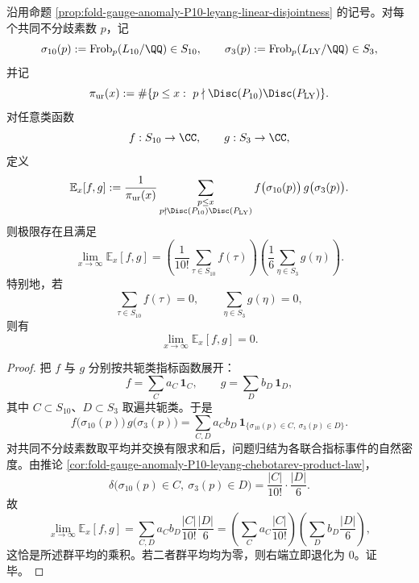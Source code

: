 \begin{theorem}\label{thm:xi-time-part9zl-leyang-rh-central-observable-decorrelation}
沿用命题 \ref{prop:fold-gauge-anomaly-P10-leyang-linear-disjointness} 的记号。对每个共同不分歧素数 \(p\)，记
\[
\sigma_{10}(p):=\mathrm{Frob}_p(L_{10}/\QQ)\in S_{10},
\qquad
\sigma_3(p):=\mathrm{Frob}_p(L_{\mathrm{LY}}/\QQ)\in S_3,
\]
并记
\[
\pi_{\mathrm{ur}}(x)
:=
\#\{p\le x:\ p\nmid \Disc(P_{10})\Disc(P_{\mathrm{LY}})\}.
\]
对任意类函数
\[
f:S_{10}\to\CC,
\qquad
g:S_3\to\CC,
\]
定义
\[
\mathbb E_x[f,g]
:=
\frac{1}{\pi_{\mathrm{ur}}(x)}
\sum_{\substack{p\le x\\ p\nmid \Disc(P_{10})\Disc(P_{\mathrm{LY}})}}
f\bigl(\sigma_{10}(p)\bigr)\,
g\bigl(\sigma_3(p)\bigr).
\]
则极限存在且满足
\[
\lim_{x\to\infty}\mathbb E_x[f,g]
=
\left(\frac{1}{10!}\sum_{\tau\in S_{10}}f(\tau)\right)
\left(\frac{1}{6}\sum_{\eta\in S_3}g(\eta)\right).
\]
特别地，若
\[
\sum_{\tau\in S_{10}}f(\tau)=0,
\qquad
\sum_{\eta\in S_3}g(\eta)=0,
\]
则有
\[
\lim_{x\to\infty}\mathbb E_x[f,g]=0.
\]
\end{theorem}
\begin{proof}
把 \(f\) 与 \(g\) 分别按共轭类指标函数展开：
\[
f=\sum_C a_C\,\mathbf 1_C,
\qquad
g=\sum_D b_D\,\mathbf 1_D,
\]
其中 \(C\subset S_{10}\)、\(D\subset S_3\) 取遍共轭类。于是
\[
f\bigl(\sigma_{10}(p)\bigr)\,g\bigl(\sigma_3(p)\bigr)
=
\sum_{C,D}a_Cb_D\,
\mathbf 1_{\{\sigma_{10}(p)\in C,\ \sigma_3(p)\in D\}}.
\]
对共同不分歧素数取平均并交换有限求和后，问题归结为各联合指标事件的自然密度。由推论 \ref{cor:fold-gauge-anomaly-P10-leyang-chebotarev-product-law}，
\[
\delta\bigl(\sigma_{10}(p)\in C,\ \sigma_3(p)\in D\bigr)
=
\frac{|C|}{10!}\cdot \frac{|D|}{6}.
\]
故
\[
\lim_{x\to\infty}\mathbb E_x[f,g]
=
\sum_{C,D}a_Cb_D\frac{|C|}{10!}\frac{|D|}{6}
=
\left(\sum_C a_C\frac{|C|}{10!}\right)
\left(\sum_D b_D\frac{|D|}{6}\right),
\]
这恰是所述群平均的乘积。若二者群平均均为零，则右端立即退化为 \(0\)。证毕。
\end{proof}

